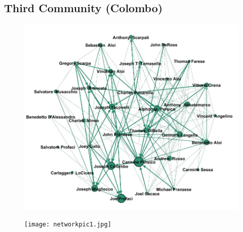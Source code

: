 \documentclass{article}
\begin{document}
\textcolor{Titoli}{\subsection{Third Community (Colombo)}}
\begin{figure}[h!]
\vspace{35pt}
\centering
\includegraphics[width=550pt]{colombomodule.JPG}
\advance\leftskip-2.5cm
\end{figure}
\newpage



\begin{figure}[t!]
\vspace{-250pt}
\centering
\texttt{[image: networkpic1.jpg]}
\advance\leftskip-3.52cm
\end{figure}
\end{document}
